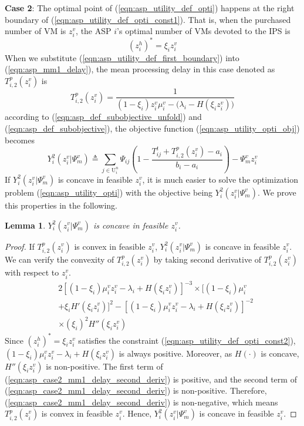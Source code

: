 \documentclass[conference]{IEEEtran}
\newtheorem{lemma}{Lemma}
\begin{document}
\textbf{Case 2}: The optimal point of (\ref{eqn:asp_utility_def_opti}) happens at the right boundary of (\ref{eqn:asp_utility_def_opti_const1}). That is, when the purchased number of VM is $z_i^v$, the ASP $i$'s optimal number of VMs devoted to the IPS is
\begin{equation} \label{eqn:asp_utility_def_first_boundary}
(z_i^h)^* = \xi_i z_i^v
\end{equation}
When we substitute (\ref{eqn:asp_utility_def_first_boundary}) into (\ref{eqn:asp_mm1_delay}), the mean processing delay in this case denoted as $T_{i,2}^p(z_i^v)$ is
\begin{equation} \label{eqn:asp_case2_mm1_delay}
T_{i,2}^p(z_i^v) =  \frac{1}{(1-\xi_i)z_i^v\mu_i^v - \big(\lambda_i - H(\xi_iz_i^v)\big)}
\end{equation}
according to (\ref{eqn:asp_def_subobjective_unfold}) and (\ref{eqn:asp_def_subobjective}), the objective function (\ref{eqn:asp_utility_opti_obj}) becomes
\begin{equation} \label{eqn:asp_case2_objective}
Y_i^2(z_i^v|\Psi_m^v) \triangleq \sum_{j \in \mathrm{U}_i^n}\Psi_{ij}(1-\frac{T_{ij}^t + T_{i,2}^p(z_i^v)-a_i}{b_i-a_i}) - \Psi_m^vz_i^v
\end{equation}
If $Y_i^2(z_i^v|\Psi_m^v)$ is concave in feasible $z_i^v$, it is much easier to solve the optimization problem (\ref{eqn:asp_utility_opti}) with the objective being $Y_i^2(z_i^v|\Psi_m^v)$. We prove this properties in the following.
\begin{lemma} \label{lemma:asp_case2_utility_concave}
$Y_i^2(z_i^v|\Psi_m^v)$ is concave in feasible $z_i^v$.
\end{lemma}
\begin{proof}
If $T_{i,2}^p(z_i^v)$ is convex in feasible $z_i^v$, $Y_i^2(z_i^v|\Psi_m^v)$ is concave in feasible $z_i^v$. We can verify the convexity of $T_{i,2}^p(z_i^v)$ by taking second derivative of $T_{i,2}^p(z_i^v)$ with respect to $z_i^v$.
\begin{equation} \label{eqn:asp_case2_mm1_delay_second_deriv}
\begin{aligned}
&2[(1-\xi_i)\mu_i^v z_i^v - \lambda_i + H(\xi_i z_i^v)]^{-3}\times [(1-\xi_i)\mu_i^v\\
&+ \xi_i H'(\xi_i z_i^v)]^2-[(1-\xi_i)\mu_i^v z_i^v - \lambda_i + H(\xi_i z_i^v)]^{-2}  \\
& \times (\xi_i)^2 H''(\xi_i z_i^v)
\end{aligned}{}
\end{equation}
Since $(z_i^h)^* = \xi_i z_i^v$ satisfies the constraint (\ref{eqn:asp_utility_def_opti_const2}), $(1-\xi_i)\mu_i^v z_i^v - \lambda_i + H(\xi_i z_i^v)$ is always positive. Moreover, as $H(\cdot)$ is concave, $H''(\xi_i z_i^v)$ is non-positive. The first term of (\ref{eqn:asp_case2_mm1_delay_second_deriv}) is positive, and the second term of (\ref{eqn:asp_case2_mm1_delay_second_deriv}) is non-positive. Therefore, (\ref{eqn:asp_case2_mm1_delay_second_deriv}) is non-negative, which means $T_{i,2}^p(z_i^v)$ is convex in feasible $z_i^v$. Hence, $Y_i^2(z_i^v|\Psi_m^v)$ is concave in feasible $z_i^v$. \qedhere
\end{proof}
\end{document}
